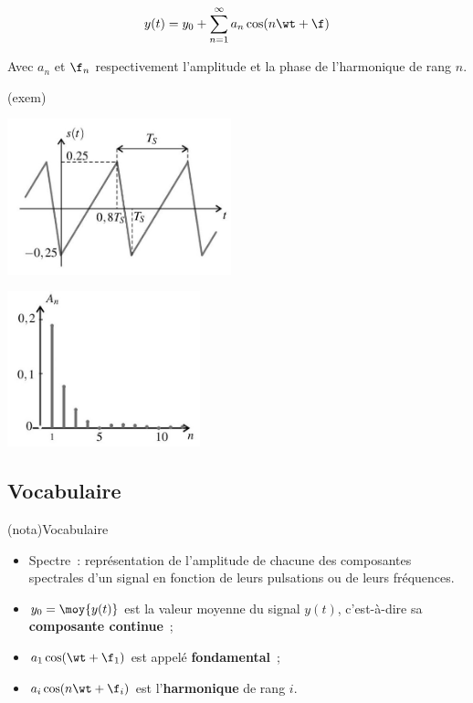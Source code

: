 \documentclass[../main/main.tex]{subfiles}
\begin{document}
{\begin{tcb}
		\[
			y(t) = y_0 + \sum_{n=1}^{\infty} a_n \cos(n\wt + \f)
		\]

		Avec $a_n$ et $\f_n$ respectivement l'amplitude et la phase de l'harmonique de
		rang $n$.
	\end{tcb}


	\begin{tcb}[sidebyside](exem){}
		\begin{center}
			\includegraphics[height=4.5cm]{tp15_spectre-temp}
		\end{center}
		\tcblower
		\begin{center}
			\includegraphics[height=4.5cm]{tp15_spectre-f}
		\end{center}
	\end{tcb}

	\subsection{Vocabulaire}

	\begin{tcb}(nota){Vocabulaire}
		\begin{itemize}
			\item Spectre~: représentation de l'amplitude de chacune des composantes
			      spectrales d'un signal en fonction de leurs pulsations ou de leurs
			      fréquences.
			\item $y_0 = \moy{y(t)}$ est la valeur moyenne du signal $y(t)$,
			      c'est-à-dire sa \textbf{composante continue}~;
			\item $a_1 \cos(\wt + \f_1)$ est appelé
			      \textbf{fondamental}~;
			\item $a_i \cos(n\wt + \f_i)$ est l'\textbf{harmonique} de
			      rang $i$.
		\end{itemize}
	\end{tcb}

}
\end{document}
